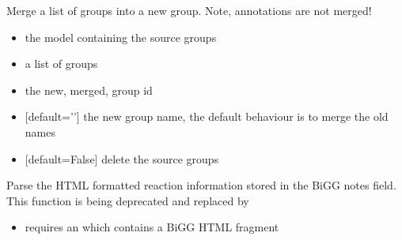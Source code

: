 \documentclass[letterpaper,10pt,english]{sphinxmanual}
\begin{document}

\begin{fulllineitems}
\label{\detokenize{modules_doc:cbmpy.CBTools.mergeGroups}}
\pysigstartsignatures
{}
\pysigstopsignatures
\sphinxAtStartPar
Merge a list of groups into a new group. Note, annotations are not merged!
\begin{itemize}
\item {} 
\sphinxAtStartPar
{} the model containing the source groups

\item {} 
\sphinxAtStartPar
{} a list of groups

\item {} 
\sphinxAtStartPar
{} the new, merged, group id

\item {} 
\sphinxAtStartPar
{} {[}default=’’{]} the new group name, the default behaviour is to merge the old names

\item {} 
\sphinxAtStartPar
{} {[}default=False{]} delete the source groups

\end{itemize}

\end{fulllineitems}


\begin{fulllineitems}
\label{\detokenize{modules_doc:cbmpy.CBTools.processBiGGannotationNote}}
\pysigstartsignatures
{}
\pysigstopsignatures
\sphinxAtStartPar
Parse the HTML formatted reaction information stored in the BiGG notes field.
This function is being deprecated and replaced by 
\begin{itemize}
\item {} 
\sphinxAtStartPar
requires an  which contains a BiGG HTML fragment

\end{itemize}

\end{fulllineitems}
\end{document}
